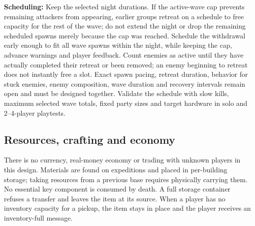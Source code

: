 \textbf{Scheduling:} Keep the selected night durations. If the active-wave cap prevents remaining attackers from appearing, earlier groups retreat on a schedule to free capacity for the rest of the wave; do not extend the night or drop the remaining scheduled spawns merely because the cap was reached. Schedule the withdrawal early enough to fit all wave spawns within the night, while keeping the cap, advance warnings and player feedback. Count enemies as active until they have actually completed their retreat or been removed; an enemy beginning to retreat does not instantly free a slot. Exact spawn pacing, retreat duration, behavior for stuck enemies, enemy composition, wave duration and recovery intervals remain open and must be designed together. Validate the schedule with slow kills, maximum selected wave totals, fixed party sizes and target hardware in solo and 2--4-player playtests.


\subsection{Resources, crafting and economy}
There is no currency, real-money economy or trading with unknown players in this design. Materials are found on expeditions and placed in per-building storage; taking resources from a previous base requires physically carrying them. No essential key component is consumed by death. A full storage container refuses a transfer and leaves the item at its source. When a player has no inventory capacity for a pickup, the item stays in place and the player receives an inventory-full message.

